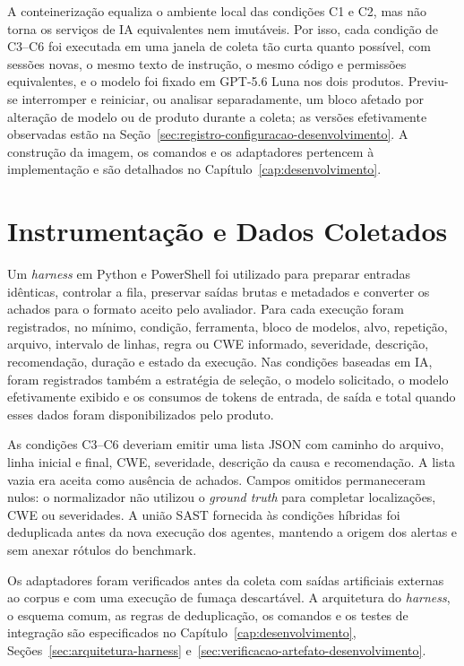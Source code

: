 A conteinerização equaliza o ambiente local das condições C1 e C2, mas não torna os serviços de IA equivalentes nem imutáveis. Por isso, cada condição de C3--C6 foi executada em uma janela de coleta tão curta quanto possível, com sessões novas, o mesmo texto de instrução, o mesmo código e permissões equivalentes, e o modelo foi fixado em GPT-5.6 Luna nos dois produtos. Previu-se interromper e reiniciar, ou analisar separadamente, um bloco afetado por alteração de modelo ou de produto durante a coleta; as versões efetivamente observadas estão na Seção~\ref{sec:registro-configuracao-desenvolvimento}. A construção da imagem, os comandos e os adaptadores pertencem à implementação e são detalhados no Capítulo~\ref{cap:desenvolvimento}.

\section{Instrumentação e Dados Coletados}\label{subsec:implementacao-harness}

Um \textit{harness} em Python e PowerShell foi utilizado para preparar entradas idênticas, controlar a fila, preservar saídas brutas e metadados e converter os achados para o formato aceito pelo avaliador. Para cada execução foram registrados, no mínimo, condição, ferramenta, bloco de modelos, alvo, repetição, arquivo, intervalo de linhas, regra ou CWE informado, severidade, descrição, recomendação, duração e estado da execução. Nas condições baseadas em IA, foram registrados também a estratégia de seleção, o modelo solicitado, o modelo efetivamente exibido e os consumos de tokens de entrada, de saída e total quando esses dados foram disponibilizados pelo produto.

As condições C3--C6 deveriam emitir uma lista JSON com caminho do arquivo, linha inicial e final, CWE, severidade, descrição da causa e recomendação. A lista vazia era aceita como ausência de achados. Campos omitidos permaneceram nulos: o normalizador não utilizou o \textit{ground truth} para completar localizações, CWE ou severidades. A união SAST fornecida às condições híbridas foi deduplicada antes da nova execução dos agentes, mantendo a origem dos alertas e sem anexar rótulos do benchmark.

Os adaptadores foram verificados antes da coleta com saídas artificiais externas ao corpus e com uma execução de fumaça descartável. A arquitetura do \textit{harness}, o esquema comum, as regras de deduplicação, os comandos e os testes de integração são especificados no Capítulo~\ref{cap:desenvolvimento}, Seções~\ref{sec:arquitetura-harness} e~\ref{sec:verificacao-artefato-desenvolvimento}.

